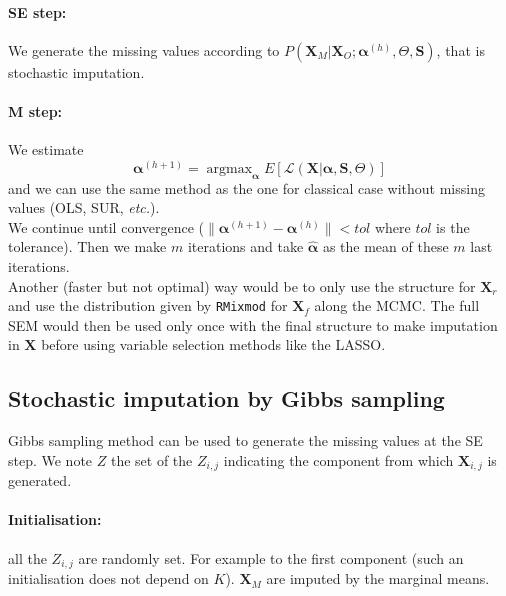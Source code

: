 \documentclass[12pt,a4paper]{report}
\begin{document}
	\paragraph{SE step:}
		We generate the missing values according to $P(\boldsymbol{X}_M|\boldsymbol{X}_O; \boldsymbol{\alpha}^{(h)},\Theta,\boldsymbol{S})$, that is stochastic imputation.
	\paragraph{M step:}
		We estimate 
		\begin{equation}
	\boldsymbol{\alpha}^{(h+1)}=\operatorname{argmax}_{\boldsymbol{\alpha}}E\left[\mathcal{L}(\boldsymbol{X}|\boldsymbol{\alpha},\boldsymbol{S},\Theta) \right]
\end{equation}
and we can use the same method as the one for classical case without missing values (OLS, SUR, {\it etc.}).\\

		We continue until convergence ($\parallel \boldsymbol{\alpha}^{(h+1)} - \boldsymbol{\alpha}^{(h)}\parallel < tol $ where $tol$ is the tolerance). Then we make $m$ iterations and take $\hat{\boldsymbol{\alpha}}$ as the mean of these $m$ last iterations.\\
		
		
Another (faster but not optimal) way would be to only use the structure for $\boldsymbol{X}_r$ and use the distribution given by {\tt RMixmod} for $\boldsymbol{X}_f$ along the MCMC. The full SEM would then be used only once with the final structure to make imputation in $\boldsymbol{X}$ before using variable selection methods like the LASSO.


	\subsection{Stochastic imputation by Gibbs sampling}
		Gibbs sampling method can be used to generate the missing values at the SE step. We note $Z$ the set of the $Z_{i,j}$ indicating the component from which $\boldsymbol{X}_{i,j}$ is generated.
		\paragraph{Initialisation:} all the $Z_{i,j}$ are randomly set. For example to the first component (such an initialisation does not depend on $K$). $\boldsymbol{X}_M$ are imputed by the marginal means.
\end{document}
